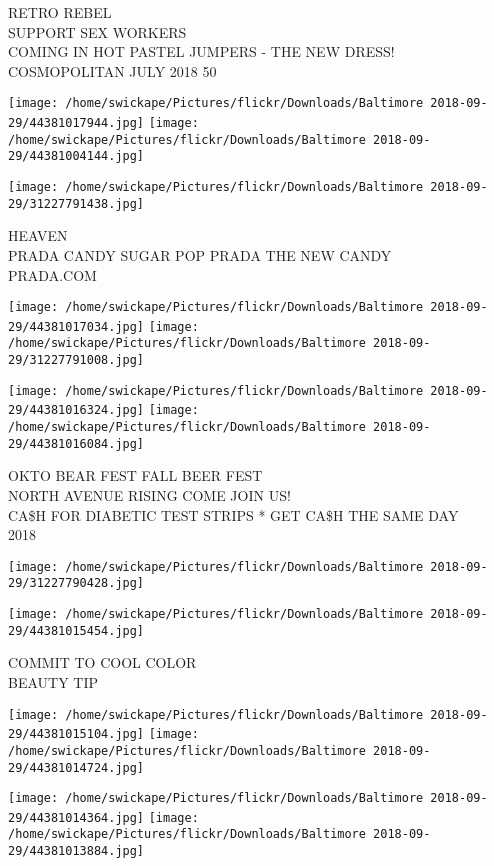 \documentclass[10pt,letterpaper]{article}
\begin{document}
RETRO REBEL\\
SUPPORT SEX WORKERS\\
COMING IN HOT PASTEL JUMPERS {-} THE NEW DRESS!\\
COSMOPOLITAN JULY 2018 50
\pagebreak

\texttt{[image: /home/swickape/Pictures/flickr/Downloads/Baltimore 2018-09-29/44381017944.jpg]}
\texttt{[image: /home/swickape/Pictures/flickr/Downloads/Baltimore 2018-09-29/44381004144.jpg]}

\vspace{0.25in}
\texttt{[image: /home/swickape/Pictures/flickr/Downloads/Baltimore 2018-09-29/31227791438.jpg]}

HEAVEN\\
PRADA CANDY SUGAR POP PRADA THE NEW CANDY\\
PRADA.COM
\pagebreak

\texttt{[image: /home/swickape/Pictures/flickr/Downloads/Baltimore 2018-09-29/44381017034.jpg]}
\texttt{[image: /home/swickape/Pictures/flickr/Downloads/Baltimore 2018-09-29/31227791008.jpg]}

\texttt{[image: /home/swickape/Pictures/flickr/Downloads/Baltimore 2018-09-29/44381016324.jpg]}
\texttt{[image: /home/swickape/Pictures/flickr/Downloads/Baltimore 2018-09-29/44381016084.jpg]}

OKTO BEAR FEST FALL BEER FEST\\
NORTH AVENUE RISING COME JOIN US!\\
CA\$H FOR DIABETIC TEST STRIPS * GET CA\$H THE SAME DAY\\
2018
\pagebreak

\texttt{[image: /home/swickape/Pictures/flickr/Downloads/Baltimore 2018-09-29/31227790428.jpg]}

\vspace{0.25in}
\texttt{[image: /home/swickape/Pictures/flickr/Downloads/Baltimore 2018-09-29/44381015454.jpg]}

COMMIT TO COOL COLOR\\
BEAUTY TIP
\pagebreak

\texttt{[image: /home/swickape/Pictures/flickr/Downloads/Baltimore 2018-09-29/44381015104.jpg]}
\texttt{[image: /home/swickape/Pictures/flickr/Downloads/Baltimore 2018-09-29/44381014724.jpg]}

\texttt{[image: /home/swickape/Pictures/flickr/Downloads/Baltimore 2018-09-29/44381014364.jpg]}
\texttt{[image: /home/swickape/Pictures/flickr/Downloads/Baltimore 2018-09-29/44381013884.jpg]}
\end{document}
